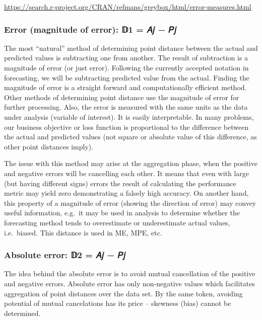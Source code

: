 \documentclass[
]{article}
\begin{document}
\url{https://search.r-project.org/CRAN/refmans/greybox/html/error-measures.html}

\hypertarget{error-magnitude-of-error-ux1d53b1-ux1d434ux1d457-ux1d443ux1d457}{%
\subsubsection{Error (magnitude of error): 𝔻1 = 𝐴𝑗 −
𝑃𝑗}\label{error-magnitude-of-error-ux1d53b1-ux1d434ux1d457-ux1d443ux1d457}}

The most ``natural'' method of determining point distance between the
actual and predicted values is subtracting one from another. The result
of subtraction is a magnitude of error (or just error). Following the
currently accepted notation in forecasting, we will be subtracting
predicted value from the actual. Finding the magnitude of error is a
straight forward and computationally efficient method. Other methods of
determining point distance use the magnitude of error for further
processing. Also, the error is measured with the same units as the data
under analysis (variable of interest). It is easily interpretable. In
many problems, our business objective or loss function is proportional
to the difference between the actual and predicted values (not square or
absolute value of this difference, as other point distances imply).

The issue with this method may arise at the aggregation phase, when the
positive and negative errors will be cancelling each other. It means
that even with large (but having different signs) errors the result of
calculating the performance metric may yield zero demonstrating a
falsely high accuracy. On another hand, this property of a magnitude of
error (showing the direction of error) may convey useful information,
e.g.~it may be used in analysis to determine whether the forecasting
method tends to overestimate or underestimate actual values,
i.e.~biased. This distance is used in ME, MPE, etc.

\hypertarget{absolute-error-ux1d53b2-ux1d434ux1d457-ux1d443ux1d457}{%
\subsubsection{Absolute error: 𝔻2 = \textbar 𝐴𝑗 −
𝑃𝑗\textbar{}}\label{absolute-error-ux1d53b2-ux1d434ux1d457-ux1d443ux1d457}}

The idea behind the absolute error is to avoid mutual cancellation of
the positive and negative errors. Absolute error has only non-negative
values which facilitates aggregation of point distances over the data
set. By the same token, avoiding potential of mutual cancelations has
its price -- skewness (bias) cannot be determined.
\end{document}
